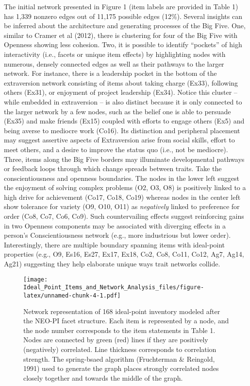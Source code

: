 \documentclass[english,man]{apa6}
\theoremstyle{definition}
\theoremstyle{definition}
\theoremstyle{remark}
\begin{document}
The initial network presented in Figure 1 (item labels are provided in
Table 1) has 1,339 nonzero edges out of 11,175 possible edges (12\%).
Several insights can be inferred about the architecture and generating
processes of the Big Five. One, similar to Cramer et al (2012), there is
clustering for four of the Big Five with Openness showing less cohesion.
Two, it is possible to identify \enquote{pockets} of high interactivity
(i.e., facets or unique item effects) by highlighting nodes with
numerous, densely connected edges as well as their pathways to the
larger network. For instance, there is a leadership pocket in the bottom
of the extraversion network consisting of items about taking charge
(Ex33), following others (Ex31), or enjoyment of project leadership
(Ex34). Notice this cluster -- while embedded in extraversion -- is also
distinct because it is only connected to the larger network by a few
nodes, such as the belief one is able to persuade (Ex35) and make
friends (Ex15) coupled with efforts to engage others (Ex5) and being
averse to mediocre work (Co16). Its distinction and peripheral placement
may suggest assertive aspects of Extraversion arise from social skills,
effort to meet others, and a desire to improve the status quo (i.e., not
be mediocre). Three, items along the Big Five borders may illuminate
developmental pathways or feedback loops through which change spreads
between traits. Take the conscientiousness and openness boundaries. The
nodes in the lower left suggest the enjoyment of solving complex
problems (O2, O3, O8) is positively linked to a high drive for
achievement (Co17, Co18, Co19) whereas nodes in the center left show
tolerance for variety (O9, O10, O11) as \emph{negatively} linked to
preference for order (Co8, Co7, Co6, Co9). Such countervailing effects
suggest reinforcing gains in two Openness components may be associated
with diverging effects in a person's Conscientiousness network (e.g.,
more industrious but lower order). Interestingly, there are multiple
boundary spanning items with ideal-point properties (e.g., O9, Es16,
Es27, Ex17, Ex18, Co2, Co8, Co11, Co12, Ag7, Ag14, Ag21) suggesting they
help elaborate unique ways trait networks collide.

\begin{figure}[htbp]
\centering
\texttt{[image: Ideal\_Point\_Items\_and\_Network\_Analysis\_files/figure-latex/unnamed-chunk-4-1.pdf]}
\caption{\label{fig:unnamed-chunk-4}Network representation of 168
ideal-point inventory modeled after the NEO-PI facet structure. Each
item is represented by a node, and the node number corresponds to the
item statements in Table 1. Nodes are connected by green (red) lines if
they are positively (negatively) correlated. Line thickness corresponds
to correlation strength. The spring-bsaed algorithm (Fruchterman \&
Reingold, 1991) used to generate the graph places strongly correlated
nodes closely together and towards the middle of the graph.}
\end{figure}
\end{document}
